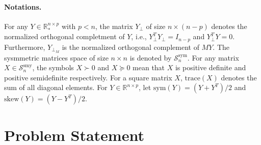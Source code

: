 \documentclass[11pt]{article}
\newcommand{\zwhcomm}[2]{{\sf\color{purple} #1}{\sf\color{blue} #2}}
\newtheorem{definition}{Definition}[section]
\numberwithin{equation}{section}
\begin{document}

\paragraph{Notations.} %
For any $Y\in \mathbb{R}_*^{n\times p}$ with $p<n$, the matrix $Y_\perp$ of size $n\times(n-p)$ denotes the normalized orthogonal completment of $Y$, i.e., $Y_\perp^TY_\perp=I_{n-p}$ and $Y_\perp^TY=0$. Furthermore, $Y_{\perp_M}$ is the normalized orthogonal complement of $MY$. The sysmmetric matrices space of size $n\times n$ is denoted by $\mathcal{S}_n^{\mathrm{sym}}$. For any matrix $X\in\mathcal{S}_n^{\mathrm{smy}}$, the symbols $X \succ0$ and $X\succeq0$ mean that $X$ is positive definite and positive semidefinite respectively. For a square matrix $X$, $\mathrm{trace}(X)$ denotes the sum of all diagonal elements. For $Y\in\mathbb{R}^{n\times p}$, let $\mathrm{sym}(Y)=(Y+Y^T)/2$ and $\mathrm{skew}(Y)=(Y-Y^T)/2$.



\section{Problem Statement} \label{ProbStat}

\end{document}
